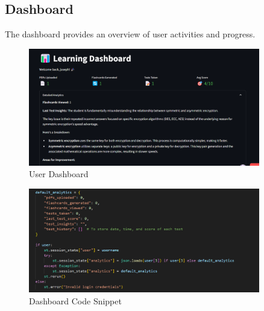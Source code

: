 \documentclass{report}
\begin{document}
\subsection{Dashboard}
The dashboard provides an overview of user activities and progress.
\begin{figure}[H]
\centering
\includegraphics[width=0.9\textwidth]{dashboard.png}
\caption{User Dashboard}
\end{figure}
\begin{figure}[H]
\centering
\includegraphics[width=0.9\textwidth]{dashboard-code.png}
\caption{Dashboard Code Snippet}
\end{figure}

\end{document}
